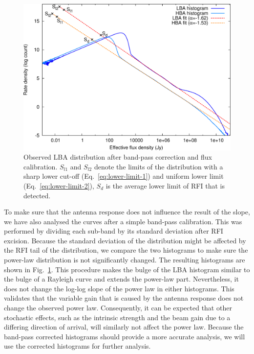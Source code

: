 \documentclass[useAMS,usenatbib]{mn2e}
\newcommand{\editmark}[1]{{\color{red}{\textbf{#1}}}}
\begin{document}
\begin{figure}
\begin{center}
\includegraphics[width=13cm]{img/histograms-corrected-trimmed}
\caption{Observed LBA distribution after band-pass correction and flux calibration. $S_{l1}$ and $S_{l2}$ denote the limits of the distribution with a sharp lower cut-off (Eq.~\eqref{eq:lower-limit-1}) and uniform lower limit (Eq.~\eqref{eq:lower-limit-2}), $S_d$ is the average lower limit of RFI that is detected.}
\label{fig:histogram-passband-corrected}
\end{center}
\end{figure}

To make sure that the antenna response does not influence the result of the slope, we have also analysed the curves after a simple band-pass calibration. This was performed by dividing each sub-band by its standard deviation after RFI excision. Because the standard deviation of the distribution might be affected by the RFI tail of the distribution, we compare the two histograms to make sure the power-law distribution is not significantly changed. The resulting histograms are shown in Fig.~\ref{fig:histogram-passband-corrected}. This procedure makes the bulge of the LBA histogram similar to the bulge of a Rayleigh curve and extends the power-law part. Nevertheless, it does not change the log-log slope of the power law in either histograms. This validates that the variable gain that is caused by the antenna response does not change the observed power law. Consequently, it can be expected that other stochastic effects, such as the intrinsic \editmark{RFI source} strength and the beam gain due to a differing direction of arrival, will similarly not affect the power law. Because the band-pass corrected histograms should provide a more accurate analysis, we will use the corrected histograms for further analysis.
\end{document}
